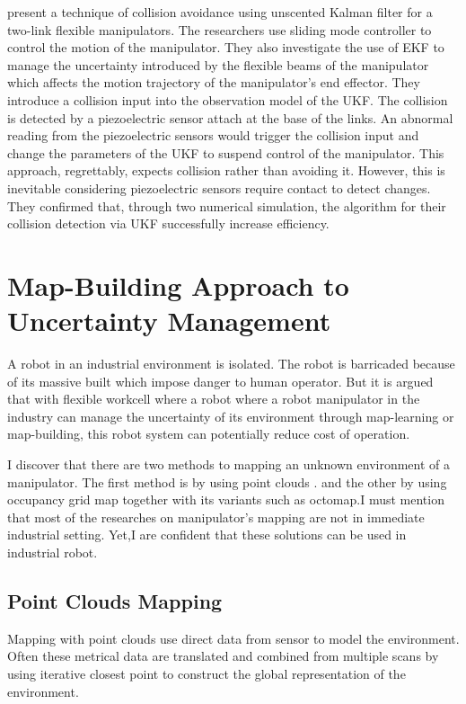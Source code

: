 \textcite{Sawada2012} present a technique of collision avoidance using unscented
Kalman filter for a two-link flexible manipulators. The researchers use sliding mode controller to
control the motion of the manipulator. They also investigate the use of \acrshort{EKF} to
manage the uncertainty introduced by the flexible beams of the manipulator which affects the
motion trajectory of the manipulator's end effector. They introduce a collision input into the
observation model of the UKF. The collision is detected by a piezoelectric sensor attach at the
base of the links. An abnormal reading from the piezoelectric sensors would trigger the collision
input and change the parameters of the UKF to suspend control of the manipulator. This
approach, regrettably, expects collision rather than avoiding it. However, this is inevitable
considering piezoelectric sensors require contact to detect changes. They confirmed that,
through two numerical simulation, the algorithm for their collision detection via UKF successfully
increase efficiency.


\section{Map-Building Approach to Uncertainty Management}\label{sec:map_uncertainty}

A robot in an industrial environment is isolated. The robot is barricaded because of its massive
built which impose danger to human operator. But it is argued that with flexible workcell where a
robot where a robot manipulator in the industry can manage the uncertainty of its environment
through map-learning or map-building, this robot system can potentially reduce cost of
operation.

I discover that there are two methods to mapping an unknown environment of a
manipulator. The first method is by using point clouds \textcite{Um2013, Wang2017}. and
the other by using occupancy grid map together with its variants such as octomap.I must
mention that most of the researches on manipulator’s mapping are not in immediate industrial
setting. Yet,I are confident that these solutions can be used in industrial robot.

\subsection{Point Clouds Mapping}\label{sec:pointclouds_map}
Mapping with point clouds use direct data from sensor to model the environment. Often these
metrical data are translated and combined from multiple scans by using iterative closest point to
construct the global representation of the environment.

